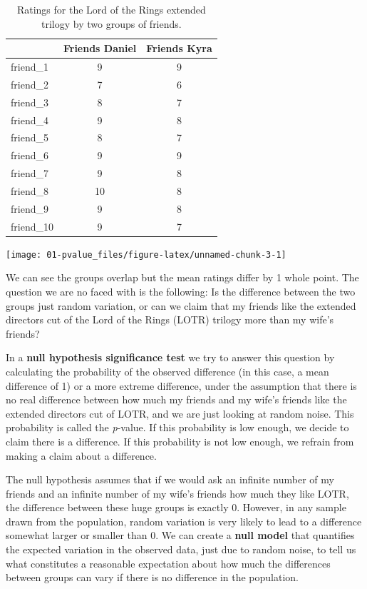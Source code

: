 \documentclass[
  oneside]{book}
\begin{document}
\begin{table}

\caption{\label{tab:friends}Ratings for the Lord of the Rings extended trilogy by two groups of friends.}
\begin{tabular}[t]{lcc}
\toprule
 & Friends Daniel & Friends Kyra\\
\midrule
friend\_1 & 9 & 9\\
friend\_2 & 7 & 6\\
friend\_3 & 8 & 7\\
friend\_4 & 9 & 8\\
friend\_5 & 8 & 7\\
\addlinespace
friend\_6 & 9 & 9\\
friend\_7 & 9 & 8\\
friend\_8 & 10 & 8\\
friend\_9 & 9 & 8\\
friend\_10 & 9 & 7\\
\bottomrule
\end{tabular}
\end{table}

\begin{center}\texttt{[image: 01-pvalue\_files/figure-latex/unnamed-chunk-3-1]} \end{center}

We can see the groups overlap but the mean ratings differ by 1 whole point. The question we are no faced with is the following: Is the difference between the two groups just random variation, or can we claim that my friends like the extended directors cut of the Lord of the Rings (LOTR) trilogy more than my wife's friends?

In a \textbf{null hypothesis significance test} we try to answer this question by calculating the probability of the observed difference (in this case, a mean difference of 1) or a more extreme difference, under the assumption that there is no real difference between how much my friends and my wife's friends like the extended directors cut of LOTR, and we are just looking at random noise. This probability is called the \emph{p}-value. If this probability is low enough, we decide to claim there is a difference. If this probability is not low enough, we refrain from making a claim about a difference.

The null hypothesis assumes that if we would ask an infinite number of my friends and an infinite number of my wife's friends how much they like LOTR, the difference between these huge groups is exactly 0. However, in any sample drawn from the population, random variation is very likely to lead to a difference somewhat larger or smaller than 0. We can create a \textbf{null model} that quantifies the expected variation in the observed data, just due to random noise, to tell us what constitutes a reasonable expectation about how much the differences between groups can vary if there is no difference in the population.
\end{document}
